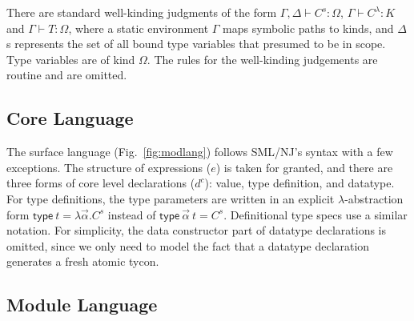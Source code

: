 \documentclass[9pt,nocopyrightspace, fleqn]{sigplanconf}
\begin{document}
There are standard well-kinding judgments of the form
$\Gamma,\Delta\vdash C^s : \Omega$, $\Gamma \vdash C^\lambda : K$ and
$\Gamma \vdash T : \Omega$, where a static environment $\Gamma$ maps
symbolic paths to kinds, and $\Delta$s represents the set of all bound
type variables that presumed to be in scope. Type variables are of
kind $\Omega$. The rules for the well-kinding judgements are routine
and are omitted.



\subsection{Core Language}

The surface language (Fig.~\ref{fig:modlang}) follows SML/NJ's
syntax with a few exceptions. The structure of expressions ($e$) is
taken for granted, and there are three forms of core level
declarations ($d^c$): value, type definition, and datatype. For type
definitions, the type parameters are written in an explicit
$\lambda$-abstraction form $\mathsf{type}~t = \lambda\vec{\alpha}.C^s$
instead of $\mathsf{type}~\vec{\alpha}~t=C^s$. Definitional type specs
use a similar notation. For simplicity, the data constructor part of
datatype declarations is omitted, since we only need to model the fact
that a datatype declaration generates a fresh atomic tycon.





\subsection{Module Language}
\end{document}
